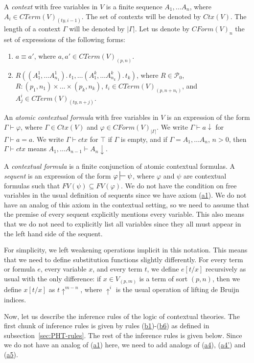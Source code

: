 \documentclass[reqno]{amsart}
\newcommand{\axref}[1]{(\hyperref[ax:#1]{#1})}
\theoremstyle{definition}
\theoremstyle{remark}
\newcommand{\deq}{\equiv}
\numberwithin{figure}{section}
\begin{document}
A \emph{context} with free variables in $V$ is a finite sequence $A_1, \ldots A_n$, where $A_i \in CTerm(V)_{(ty,i-1)}$.
The set of contexts will be denoted by $Ctx(V)$.
The length of a context $\Gamma$ will be denoted by $|\Gamma|$.
Let us denote by $CForm(V)_n$ the set of expressions of the following forms:
\begin{enumerate}
\item $a \deq a'$, where $a,a' \in CTerm(V)_{(p,n)}$.
\item $R((A^1_1, \ldots A^1_{n_1}).\,t_1, \ldots (A^k_1, \ldots A^k_{n_k}).\,t_k)$, where $R \in \mathcal{P}_0$, $R : (p_1,n_1) \times \ldots \times (p_k,n_k)$, $t_i \in CTerm(V)_{(p,n+n_i)}$, and $A^i_j \in CTerm(V)_{(ty,n+j)}$.
\end{enumerate}

An \emph{atomic contextual formula} with free variables in $V$ is an expression of the form $\Gamma \vdash \varphi$, where $\Gamma \in Ctx(V)$ and $\varphi \in CForm(V)_{|\Gamma|}$.
We write $\Gamma \vdash a\!\downarrow$ for $\Gamma \vdash a = a$.
We write $\Gamma \vdash ctx$ for $\top$ if $\Gamma$ is empty, and if $\Gamma = A_1, \ldots A_n$, $n > 0$, then $\Gamma \vdash ctx$ means $A_1, \ldots A_{n-1} \vdash A_n\!\downarrow$.

A \emph{contextual formula} is a finite conjunction of atomic contextual formulas.
A \emph{sequent} is an expression of the form $\varphi \sststile{}{} \psi$, where $\varphi$ and $\psi$ are contextual formulas such that $FV(\psi) \subseteq FV(\varphi)$.
We do not have the condition on free variables in the usual definition of sequents since we have axiom \axref{a1}.
We do not have an analog of this axiom in the contextual setting, so we need to assume that the premise of every sequent explicitly mentions every variable.
This also means that we do not need to explicitly list all variables since they all must appear in the left hand side of the sequent.

For simplicity, we left weakening operations implicit in this notation.
This means that we need to define substitution functions slightly differently.
For every term or formula $e$, every variable $x$, and every term $t$, we define $e[t/x]$ recursively as usual with the only difference:
if $x \in V_{(p,m)}$ is a term of sort $(p,n)$, then we define $x[t/x]$ as $t\!\uparrow^{m-n}$, where $\!\uparrow^i$ is the usual operation of lifting de Bruijn indices.

Now, let us describe the inference rules of the logic of contextual theories.
The first chunk of inference rules is given by rules \axref{b1}-\axref{b6} as defined in subsection~\eqref{sec:PHT-rules}.
The rest of the inference rules is given below.
Since we do not have an analog of \axref{a1} here, we need to add analogs of \axref{a4}, \axref{a4'} and \axref{a5}.
\end{document}
